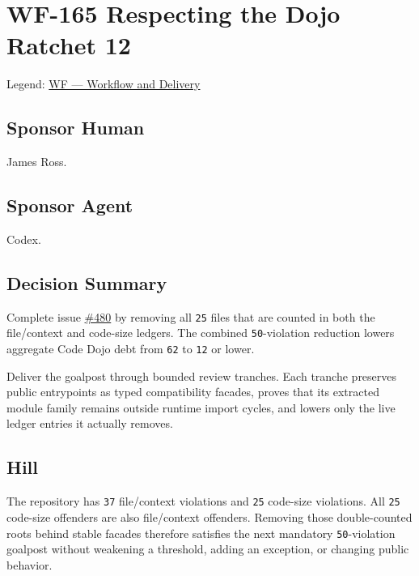 \chapter{WF-165 Respecting the Dojo Ratchet 12}\label{record-247}

\smallskip

Legend: \href{https://github.com/flyingrobots/bijou/blob/1853ad902f6bf219326409e7f743a5a1d6517dbc/docs/legends/WF-workflow-and-delivery.md}{WF --- Workflow and Delivery}

\section{Sponsor Human}\label{record-247-sponsor-human}

James Ross.

\section{Sponsor Agent}\label{record-247-sponsor-agent}

Codex.

\section{Decision Summary}\label{record-247-decision-summary}

Complete issue \href{https://github.com/flyingrobots/bijou/issues/480}{\#480} by removing all \texttt{2\allowbreak{}5} files that are counted in both the file/context and code-size ledgers. The combined \texttt{5\allowbreak{}0}-violation reduction lowers aggregate Code Dojo debt from \texttt{6\allowbreak{}2} to \texttt{1\allowbreak{}2} or lower.

Deliver the goalpost through bounded review tranches. Each tranche preserves public entrypoints as typed compatibility facades, proves that its extracted module family remains outside runtime import cycles, and lowers only the live ledger entries it actually removes.

\section{Hill}\label{record-247-hill}

The repository has \texttt{3\allowbreak{}7} file/context violations and \texttt{2\allowbreak{}5} code-size violations. All \texttt{2\allowbreak{}5} code-size offenders are also file/context offenders. Removing those double-counted roots behind stable facades therefore satisfies the next mandatory \texttt{5\allowbreak{}0}-violation goalpost without weakening a threshold, adding an exception, or changing public behavior.

